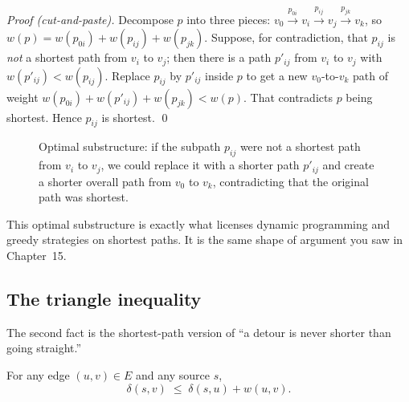 \begin{formalbox}
\emph{Proof (cut-and-paste).} Decompose $p$ into three pieces:
$v_0 \xrightarrow{p_{0i}} v_i \xrightarrow{p_{ij}} v_j \xrightarrow{p_{jk}} v_k$,
so $w(p) = w(p_{0i}) + w(p_{ij}) + w(p_{jk})$. Suppose, for contradiction, that
$p_{ij}$ is \emph{not} a shortest path from $v_i$ to $v_j$; then there is a path
$p'_{ij}$ from $v_i$ to $v_j$ with $w(p'_{ij}) < w(p_{ij})$. Replace $p_{ij}$ by
$p'_{ij}$ inside $p$ to get a new $v_0$-to-$v_k$ path of weight
$w(p_{0i}) + w(p'_{ij}) + w(p_{jk}) < w(p)$. That contradicts $p$ being shortest.
Hence $p_{ij}$ is shortest. \qed
\end{formalbox}

\begin{figure}[htbp]
\centering
{}
\caption{Optimal substructure: if the subpath $p_{ij}$ were not a shortest path from $v_i$ to $v_j$, we could replace it with a shorter path $p'_{ij}$ and create a shorter overall path from $v_0$ to $v_k$, contradicting that the original path was shortest.}
\label{ch24:fig-substructure}
\end{figure}

This optimal substructure is exactly what licenses dynamic programming and greedy
strategies on shortest paths. It is the same shape of argument you saw in
Chapter~15.

\subsection{The triangle inequality}

The second fact is the shortest-path version of ``a detour is never shorter than
going straight.''

\begin{lemma}\label{ch24:lemma-triangle}
For any edge $(u, v) \in E$ and any source $s$,
\[
\delta(s, v) \;\le\; \delta(s, u) + w(u, v).
\]
\end{lemma}

